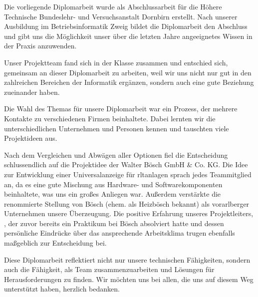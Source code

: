 Die vorliegende Diplomarbeit wurde als Abschlussarbeit für die Höhere Technische Bundeslehr- und Versuchsanstalt Dornbirn erstellt. Nach unserer Ausbildung im Betriebsinformatik Zweig bildet die Diplomarbeit den Abschluss und gibt uns die Möglichkeit unser über die letzten Jahre angeeignetes Wissen in der Praxis anzuwenden.

Unser Projektteam fand sich in der Klasse zusammen und entschied sich, gemeinsam an dieser Diplomarbeit zu arbeiten, weil wir uns nicht nur gut in den zahlreichen Bereichen der Informatik ergänzen, sondern auch eine gute Beziehung zueinander haben.

Die Wahl des Themas für unsere Diplomarbeit war ein Prozess, der mehrere Kontakte zu verschiedenen Firmen beinhaltete. Dabei lernten wir die unterschiedlichen Unternehmen und Personen kennen und tauschten viele Projektideen aus.

Nach dem Vergleichen und Abwägen aller Optionen fiel die Entscheidung schlussendlich auf die Projektidee der Walter Bösch GmbH \& Co. KG. Die Idee zur Entwicklung einer Universalanzeige für \acl{rltanlagen} sprach jedes Teammitglied an, da es eine gute Mischung aus Hardware- und Softwarekomponenten beinhaltete, was uns ein großes Anliegen war. Außerdem verstärkte die renommierte Stellung von Bösch (ehem. als Heizbösch bekannt) als vorarlberger Unternehmen unsere Überzeugung. Die positive Erfahrung unseres Projektleiters, \mangeng, der zuvor bereits ein Praktikum bei Bösch absolviert hatte und dessen persönliche Eindrücke über das ansprechende Arbeitsklima trugen ebenfalls maßgeblich zur Entscheidung bei.

Diese Diplomarbeit reflektiert nicht nur unsere technischen Fähigkeiten, sondern auch die Fähigkeit, als Team zusammenzuarbeiten und Lösungen für Herausforderungen zu finden. Wir möchten uns bei allen, die uns auf diesem Weg unterstützt haben, herzlich bedanken.